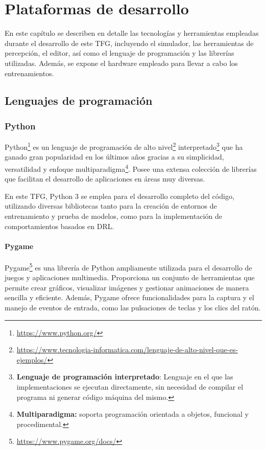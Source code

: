\chapter{Plataformas de desarrollo}
\label{cap:capitulo3}

En este capítulo se describen en detalle las tecnologías y herramientas empleadas durante el desarrollo de este \ac{TFG}, incluyendo el simulador, las herramientas de percepción, el editor, así como el lenguaje de programación y las librerías utilizadas. Además, se expone el hardware empleado para llevar a cabo los entrenamientos.

\section{Lenguajes de programación}
\label{sec:programación}
\subsection{Python}
\label{sec:python}

Python\footnote{\url{https://www.python.org/}} es un lenguaje de programación de alto nivel\footnote{\url{https://www.tecnologia-informatica.com/lenguaje-de-alto-nivel-que-es-ejemplos/}} interpretado\footnote{\textbf{Lenguaje de programación interpretado}: Lenguaje en el que las implementaciones se ejecutan directamente, sin necesidad de compilar el programa ni generar código máquina del mismo.} que ha ganado gran popularidad en los últimos años gracias a su simplicidad, versatilidad y enfoque multiparadigma\footnote{\textbf{Multiparadigma:} soporta programación orientada a objetos, funcional y procedimental.}. Posee una extensa colección de librerías que facilitan el desarrollo de aplicaciones en áreas muy diversas.

En este \ac{TFG}, Python 3 se emplea para el desarrollo completo del código, utilizando diversas bibliotecas tanto para la creación de entornos de entrenamiento y prueba de modelos, como para la implementación de comportamientos basados en \ac{DRL}.

\subsubsection{Pygame}
\label{sec:pygame}

Pygame\footnote{\url{https://www.pygame.org/docs/}} es una librería de Python ampliamente utilizada para el desarrollo de juegos y aplicaciones multimedia. Proporciona un conjunto de herramientas que permite crear gráficos, visualizar imágenes y gestionar animaciones de manera sencilla y eficiente. Además, Pygame ofrece funcionalidades para la captura y el manejo de eventos de entrada, como las pulsaciones de teclas y los clics del ratón.

